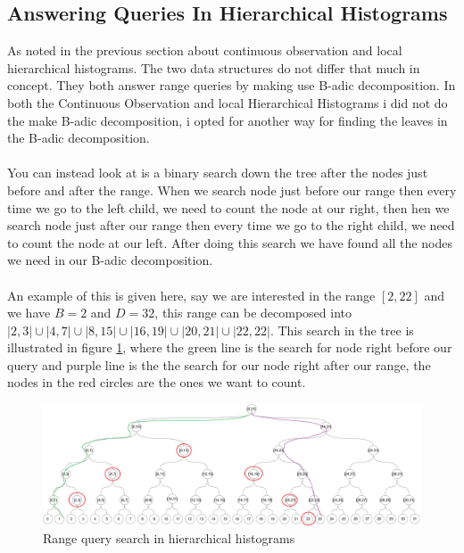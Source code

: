 \documentclass[11pt]{article}
\theoremstyle{definition}
\begin{document}
\subsection{Answering Queries In Hierarchical Histograms}\label{decom}
As noted in the previous section about continuous observation and local hierarchical histograms. The two data structures do not differ that much in concept. They both answer range queries by making use B-adic decomposition. In both the Continuous Observation and local Hierarchical Histograms i did not do the make B-adic decomposition, i opted for another way for finding the leaves in the B-adic decomposition. \\ \\
You can instead look at is a binary search down the tree after the nodes just before and after the range. When we search node just before our range then every time we go to the left child, we need to count the node at our right, then hen we search node just after our range then every time we go to the right child, we need to count the node at our left. After doing this search we have found all the nodes we need in our B-adic decomposition.\\ \\
An example of this is given here, say we are interested in the range $[2,22]$ and we have $B=2$ and $D=32$, this range can be decomposed into $|2,3| \cup|4,7| \cup|8,15| \cup|16,19| \cup|20,21| \cup|22,22|$. This search in the tree is illustrated in figure \ref{fig:disjoint_se_1}, where the green line is the search for node right before our query and purple line is the the search for our node right after our range, the nodes in the red circles are the ones we want to count. 
\begin{figure}[H]
    \centering
    \includegraphics[width=.8\linewidth]{figures/disjoint_search_1.png}
    \caption{Range query search in hierarchical histograms}
    \label{fig:disjoint_se_1}
\end{figure}
\end{document}
